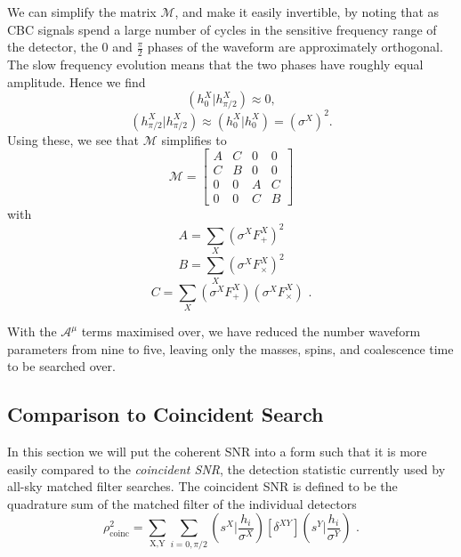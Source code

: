 \documentclass[11pt]{cuthesis}
\newcommand{\fs}{\text{ .}}
\begin{document}
We can simplify the matrix $\mathcal{M}$, and make it easily invertible, by noting that as CBC signals spend a large number of cycles in the sensitive frequency range of the detector, the $0$ and $\frac{\pi}{2}$ phases of the waveform are approximately orthogonal. The slow frequency evolution means that the two phases have roughly equal amplitude. Hence we find 
\begin{equation}
(h_0^X|h_{\pi/2}^X)\approx 0 ,
\end{equation}
\begin{equation}
(h_{\pi/2}^X|h_{\pi/2}^X)\approx (h_0^X|h_0^X) = (\sigma^X)^2 \textbf{.}
\end{equation}
Using these, we see that $\mathcal{M}$  simplifies to
\begin{equation}\label{projection matrix}
\mathcal{M}
=
\begin{bmatrix}
A & C & 0 & 0 \\
C & B & 0 & 0 \\
0 & 0 & A & C \\
0 & 0 & C & B 
\end{bmatrix}
\end{equation}
with 
\begin{equation}
A = \sum_X (\sigma^X F_+^X)^2
\end{equation}
\begin{equation}
B = \sum_X (\sigma^X F_\times^X)^2
\end{equation}
\begin{equation} \label{C eqn}
C = \sum_X (\sigma^X F_+^X)(\sigma^X F_\times^X) \fs
\end{equation}

With the  $\mathcal{A}^\mu$ terms maximised over, we have reduced the number waveform parameters from nine to five, leaving only the masses, spins, and coalescence time to be searched over. 

\subsection{Comparison to Coincident Search} \label{sec: coinc compare}
In this section we will put the coherent SNR into a form such that it is more easily compared to the \textit{coincident SNR}, the detection statistic currently used by all-sky matched filter searches. The coincident SNR is defined to be the quadrature sum of the matched filter of the individual detectors
\begin{equation} \label{rhocoinc}
\rho^2_\text{coinc} = \sum_\text{X,Y} \sum_{i=0,\pi/2} \left( s^X \bigg| \frac{h_i}{\sigma^X} \right)[\delta^{XY}]\left( s^Y \bigg| \frac{h_i}{\sigma^Y} \right) \fs
\end{equation}
\end{document}
